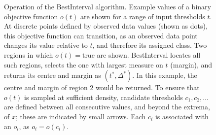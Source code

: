 \documentclass[dissertation.tex]{subfiles}
\begin{document}
\begin{figure}
\caption[The BestInterval algorithm]{Operation of the BestInterval algorithm.  Example values of a binary objective function $o(t)$ are shown for a range of input thresholds $t$.  At discrete points defined by observed data values (shown as dots), this objective function can transition, as an observed data point changes its value relative to $t$, and therefore its assigned class.  Two regions in which $o(t) = \mbox{true}$ are shown.  BestInterval locates all such regions, selects the one with largest measure on $t$ (margin), and returns its centre and margin as $(t^*, \Delta^*)$.  In this example, the centre and margin of region 2 would be returned.  To ensure that $o(t)$ is sampled at sufficient density, candidate thresholds $c_1, c_2, \dots$ are defined between all consecutive values, and beyond the extrema, of $x$; these are indicated by small arrows.  Each $c_i$ is associated with an $o_i$, as $o_i = o(c_i)$.}
\label{fig:mess_bestinterval}
\end{figure}
\end{document}
